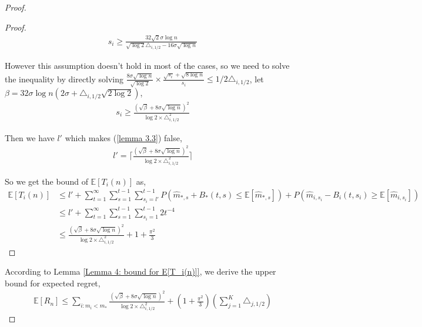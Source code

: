 \documentclass{article}
\theoremstyle{plain}
\begin{document}
\begin{proof}
\begin{proof}
    \begin{align}
        s_i \geq \frac{32 \sqrt{2} \sigma \log n}{\sqrt{\log 2} \triangle_{i, 1/2} - 16 \sigma \sqrt{\log n}} 
    \end{align}
    
    However this assumption doesn't hold in most of the cases, so we need to solve the inequality by directly solving $\frac{8\sigma \sqrt{\log n}}{  \sqrt{\log 2}} \times \frac{\sqrt{s_i} + \sqrt{8\log n}}{s_i} \leq 1/2 \triangle_{i, 1/2}$, let $\beta = 32 \sigma \log n (2 \sigma + \triangle_{i,1/2} \sqrt{2 \log 2} )$,
    \begin{align}
        s_i \geq \frac{(\sqrt{\beta} + 8 \sigma \sqrt{\log n})^2}{\log 2 \times \triangle_{i, 1/2}^2} 
    \end{align}
    
    Then we have $l'$ which makes (\ref{lemma 3.3}) false,
   \begin{align}
       l' = \lceil \frac{(\sqrt{\beta} + 8 \sigma \sqrt{\log n})^2}{\log 2 \times \triangle_{i, 1/2}^2}  \rceil %
   \end{align} 
   
    So we get the bound of $\mathbb{E}[T_i(n)]$ as,
    \begin{align}
        \mathbb{E}[T_i(n)] &\leq l' + \sum_{t = 1}^\infty \sum_{s = 1}^{t-1} \sum_{s_i = l'}^{t-1} P(\hat{m}_{*, s} + B_*(t, s) \leq  \mathbb{E}[\hat{m}_{*, s}]) + P(\hat{m}_{i, s_i} - B_i(t, s_i) \geq \mathbb{E}[\hat{m}_{i, s_i}])\\
        & \leq l' + \sum_{t = 1}^\infty \sum_{s = 1}^{t-1} \sum_{s_i = 1}^{t-1} 2 t^{-4}\\
        & \leq \frac{(\sqrt{\beta} + 8 \sigma \sqrt{\log n})^2}{\log 2 \times \triangle_{i, 1/2}^2}  + 1 + \frac{\pi^2}{3}
    \end{align}
   
\end{proof}

According to Lemma \ref{Lemma 4: bound for E[T_i(n)]}, we derive the upper bound for expected regret,
\begin{align}
    \mathbb{E}[R_n] \leq 
          \sum_{i: m_i < m_\ast} \frac{(\sqrt{\beta} + 8 \sigma \sqrt{\log n})^2}{\log 2 \times \triangle_{i, 1/2}^2}  + (1 + \frac{\pi^2}{3}) (\sum_{j=1}^K \triangle_{j, 1/2}) 
\end{align}
   
\end{proof}
\end{document}
